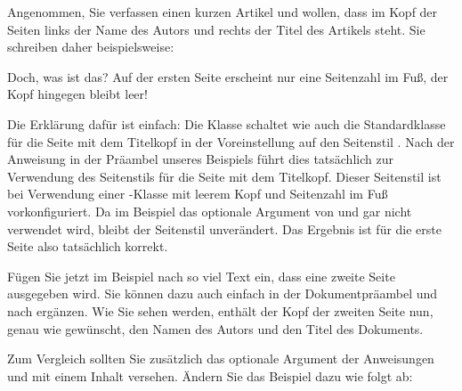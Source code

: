 \begin{Example}
  Angenommen, Sie verfassen einen kurzen Artikel und wollen, dass im Kopf der
  Seiten links der Name des Autors und rechts der Titel des Artikels
  steht. Sie schreiben daher beispielsweise:
  Doch, was ist das? Auf der ersten Seite erscheint nur eine Seitenzahl im
  Fuß, der Kopf hingegen bleibt leer!

  Die Erklärung dafür ist einfach: Die Klasse  schaltet wie
  auch die Standardklasse  für die Seite mit dem Titelkopf in
  der Voreinstellung auf den Seitenstil . Nach der Anweisung
   in der Präambel
  unseres Beispiels führt dies tatsächlich zur Verwendung des Seitenstils
   für die Seite mit dem
  Titelkopf. Dieser Seitenstil ist bei Verwendung einer \KOMAScript-Klasse mit
  leerem Kopf und Seitenzahl im Fuß vorkonfiguriert. Da im Beispiel das
  optionale Argument von  und  gar nicht verwendet
  wird, bleibt der Seitenstil 
  unverändert. Das Ergebnis ist für die erste Seite also tatsächlich korrekt.

  Fügen Sie jetzt im Beispiel nach  so viel
  Text ein, dass eine zweite Seite ausgegeben wird. Sie können dazu auch
  einfach  in der
  Dokumentpräambel und  nach
   ergänzen. Wie Sie sehen werden, enthält der
  Kopf der zweiten Seite nun, genau wie gewünscht, den Namen des Autors und
  den Titel des Dokuments.

  Zum Vergleich sollten Sie zusätzlich das optionale Argument der Anweisungen
   und  mit einem Inhalt versehen. Ändern Sie das
  Beispiel dazu wie folgt ab:
\end{Example}
